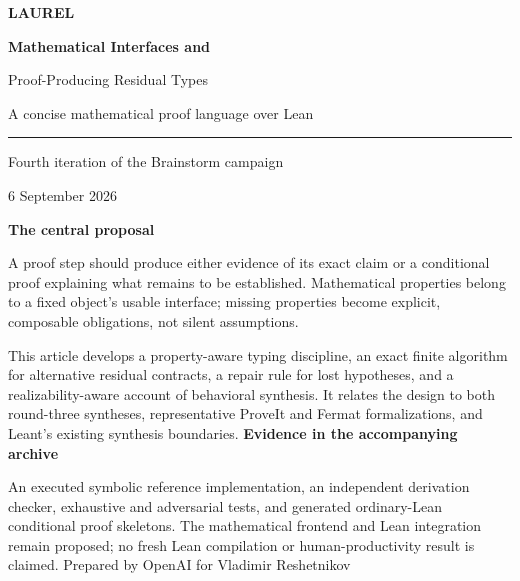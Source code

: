 \documentclass[11pt,a4paper]{article}
\theoremstyle{definition}
\theoremstyle{remark}
\begin{document}
\begin{titlepage}
\vspace*{12mm}
{\color{laurel}\fontsize{48}{52}\selectfont\bfseries LAUREL\par}
\vspace{7mm}
{\LARGE\bfseries Mathematical Interfaces and\par Proof-Producing Residual Types\par}
\vspace{5mm}
{\large A concise mathematical proof language over Lean\par}
\vspace{10mm}
{\color{gold}\rule{\textwidth}{1.2pt}}
\vspace{5mm}
{\large Fourth iteration of the Brainstorm campaign\par}
{\large 6 September 2026\par}
\vspace{12mm}
\begin{principle}
\textbf{The central proposal}\par
A proof step should produce either evidence of its exact claim or a conditional proof explaining what remains to be established. Mathematical properties belong to a fixed object's usable interface; missing properties become explicit, composable obligations, not silent assumptions.
\end{principle}
\vspace{7mm}
This article develops a property-aware typing discipline, an exact finite algorithm for alternative residual contracts, a repair rule for lost hypotheses, and a realizability-aware account of behavioral synthesis. It relates the design to both round-three syntheses, representative ProveIt and Fermat formalizations, and Leant's existing synthesis boundaries.
\vfill
\textbf{Evidence in the accompanying archive}\par
An executed symbolic reference implementation, an independent derivation checker, exhaustive and adversarial tests, and generated ordinary-Lean conditional proof skeletons. The mathematical frontend and Lean integration remain proposed; no fresh Lean compilation or human-productivity result is claimed.
\vspace{8mm}
{\small Prepared by OpenAI for Vladimir Reshetnikov}
\end{titlepage}
\end{document}
